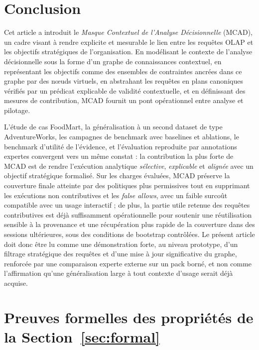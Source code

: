\documentclass[journal]{IEEEtran}
\begin{document}
\section{Conclusion}
\label{sec:conclusion}

Cet article a introduit le \emph{Masque Contextuel de l'Analyse Décisionnelle} (MCAD), un cadre visant à rendre explicite et mesurable le lien entre les requêtes OLAP et les objectifs stratégiques de l'organisation. En modélisant le contexte de l'analyse décisionnelle sous la forme d'un graphe de connaissances contextuel, en représentant les objectifs comme des ensembles de contraintes ancrées dans ce graphe par des nœuds virtuels, en abstrahant les requêtes en plans canoniques vérifiés par un prédicat explicable de validité contextuelle, et en définissant des mesures de contribution, MCAD fournit un pont opérationnel entre analyse et pilotage.

L'étude de cas FoodMart, la généralisation à un second dataset de type AdventureWorks, les campagnes de benchmark avec baselines et ablations, le benchmark d'utilité de l'évidence, et l'évaluation reproduite par annotations expertes convergent vers un même constat : la contribution la plus forte de MCAD est de rendre l'exécution analytique \emph{sélective}, \emph{explicable} et \emph{alignée} avec un objectif stratégique formalisé. Sur les charges évaluées, MCAD préserve la couverture finale atteinte par des politiques plus permissives tout en supprimant les exécutions non contributives et les \emph{false allows}, avec un faible surcoût compatible avec un usage interactif ; de plus, la partie utile retenue des requêtes contributives est déjà suffisamment opérationnelle pour soutenir une réutilisation sensible à la provenance et une récupération plus rapide de la couverture dans des sessions ultérieures, sous des conditions de bootstrap contrôlées. Le présent article doit donc être lu comme une démonstration forte, au niveau prototype, d'un filtrage stratégique des requêtes et d'une mise à jour significative du graphe, renforcée par une comparaison experte externe sur un pack borné, et non comme l'affirmation qu'une généralisation large à tout contexte d'usage serait déjà acquise.

\appendices

\section{Preuves formelles des propriétés de la Section~\ref{sec:formal}}
\label{app:proofs}
\end{document}
